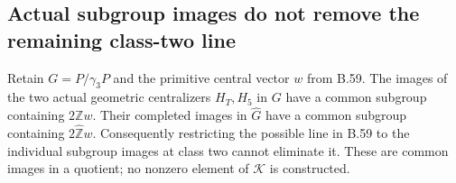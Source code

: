 \subsection*{Actual subgroup images do not remove the remaining class-two line}

Retain $G=P/\gamma_3P$ and the primitive central vector $w$
from B.59.  The images of the two actual geometric centralizers
$H_T,H_5$ in $G$ have a common subgroup containing
$2\mathbb Z w$.  Their completed images in $\widehat G$
have a common subgroup containing $2\widehat{\mathbb Z}w$.
Consequently restricting the possible line in B.59 to the
individual subgroup images at class two cannot eliminate it.
These are common images in a quotient; no nonzero element
of $\mathcal K$ is constructed.

